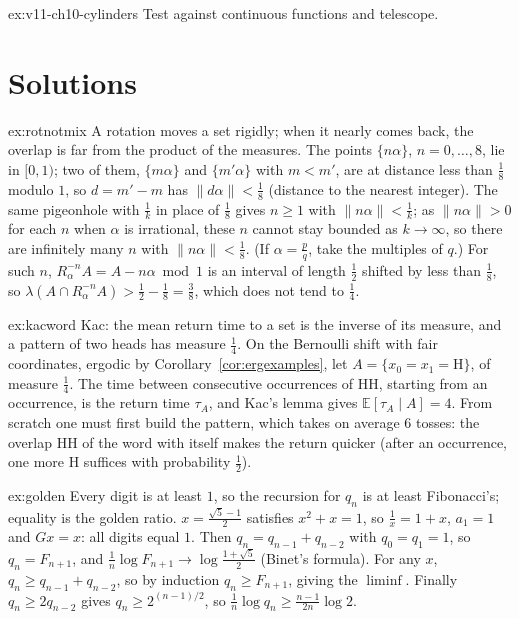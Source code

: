 \begin{hint}{ex:v11-ch10-cylinders}
Test against continuous functions and telescope.
\end{hint}

\section{Solutions}

\begin{solution}{ex:rotnotmix}
\idea A rotation moves a set rigidly; when it nearly comes back, the overlap is far from the product of the measures.
\writeup The points $\{n\alpha\}$, $n=0,\dots,8$, lie in $[0,1)$; two of them, $\{m\alpha\}$ and $\{m'\alpha\}$ with $m<m'$, are at distance less than $\frac18$ modulo $1$, so $d=m'-m$ has $\|d\alpha\|<\frac18$ (distance to the nearest integer). The same pigeonhole with $\frac1k$ in place of $\frac18$ gives $n\ge1$ with $\|n\alpha\|<\frac1k$; as $\|n\alpha\|>0$ for each $n$ when $\alpha$ is irrational, these $n$ cannot stay bounded as $k\to\infty$, so there are infinitely many $n$ with $\|n\alpha\|<\frac18$. (If $\alpha=\frac pq$, take the multiples of $q$.) For such $n$, $R_\alpha^{-n}A=A-n\alpha\bmod1$ is an interval of length $\frac12$ shifted by less than $\frac18$,
so $\lambda(A\cap R_\alpha^{-n}A)>\frac12-\frac18=\frac38$, which does not tend to $\frac14$.
\end{solution}

\begin{solution}{ex:kacword}
\idea Kac: the mean return time to a set is the inverse of its measure, and a pattern of two heads has measure $\frac14$.
\writeup On the Bernoulli shift with fair coordinates, ergodic by Corollary~\ref{cor:ergexamples}, let $A=\{x_0=x_1=\mathrm H\}$, of measure $\frac14$. The time between consecutive occurrences of HH, starting from an occurrence, is the return time
$\tau_A$, and Kac's lemma gives $\mathbb E[\tau_A\mid A]=4$. From scratch one must first build the pattern, which takes on average $6$ tosses: the overlap HH of the word with itself makes the return quicker (after an occurrence,
one more H suffices with probability $\frac12$).
\end{solution}

\begin{solution}{ex:golden}
\idea Every digit is at least $1$, so the recursion for $q_n$ is at least Fibonacci's; equality is the golden ratio.
\writeup $x=\frac{\sqrt5-1}2$ satisfies $x^2+x=1$, so $\frac1x=1+x$, $a_1=1$ and $Gx=x$: all digits equal $1$. Then $q_n=q_{n-1}+q_{n-2}$ with $q_0=q_1=1$, so $q_n=F_{n+1}$, and $\frac1n\log F_{n+1}\to\log\frac{1+\sqrt5}2$ (Binet's formula). For any $x$,
$q_n\ge q_{n-1}+q_{n-2}$, so by induction $q_n\ge F_{n+1}$, giving the $\liminf$. Finally $q_n\ge2q_{n-2}$ gives $q_n\ge2^{(n-1)/2}$, so $\frac1n\log q_n\ge\frac{n-1}{2n}\log2$.
\end{solution}


